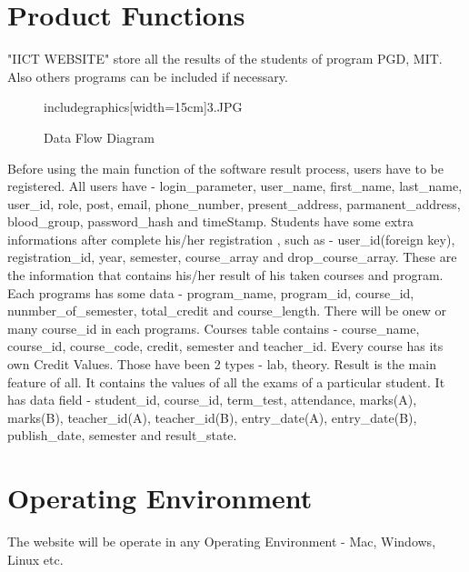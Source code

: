 \documentclass{scrreprt}
\begin{document}
    \section{Product Functions}
    "IICT WEBSITE" store all the results of the students of program PGD, MIT. Also others programs can be included if necessary.
    \begin{figure}[h!]
        \centering
        includegraphics[width=15cm]{3.JPG}
        \caption{Data Flow Diagram}
        \label{fig:Data Flow Diagram}
    \end{figure}
    Before using the main function of the software result process, users have to be registered. 
    \newline
    All users have - login\_parameter, user\_name, first\_name, last\_name, user\_id, role, post, email, phone\_number, present\_address, parmanent\_address, blood\_group, password\_hash and timeStamp.
    \newline
    Students have some extra informations after complete his/her registration , such as - user\_id(foreign key), registration\_id, year, semester, course\_array and drop\_course\_array. These are the information that contains his/her result of his taken courses and program.
    \newline
    Each programs has some data - program\_name, program\_id, course\_id, nunmber\_of\_semester, total\_credit and course\_length. There will be onew or many course\_id in each programs.
    \newline
    Courses table contains - course\_name, course\_id, course\_code, credit, semester and teacher\_id.
    \newline
    Every course has its own Credit Values. Those have been 2 types - lab, theory.
    \newline
    Result is the main feature of all. It contains the values of all the exams of a particular student. It has data field - student\_id, course\_id, term\_test, attendance, marks(A), marks(B), teacher\_id(A), teacher\_id(B), entry\_date(A), entry\_date(B), publish\_date, semester	and result\_state.
    
    \section{Operating Environment}
    The website will be operate in any Operating Environment - Mac, Windows, Linux etc. 
\end{document}
